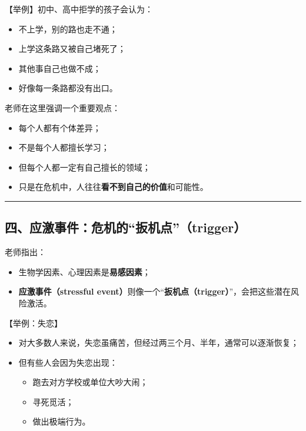 \documentclass[
  chinese,
  9pt,
  a4paper,
]{ctexart}
\providecommand{\tightlist}{%
  \setlength{\itemsep}{0pt}\setlength{\parskip}{0pt}}
\begin{document}
【举例】初中、高中拒学的孩子会认为：

\begin{itemize}
\tightlist
\item
  不上学，别的路也走不通；
\item
  上学这条路又被自己堵死了；
\item
  其他事自己也做不成；
\item
  好像每一条路都没有出口。
\end{itemize}

老师在这里强调一个重要观点：

\begin{itemize}
\tightlist
\item
  每个人都有个体差异；
\item
  不是每个人都擅长学习；
\item
  但每个人都一定有自己擅长的领域；
\item
  只是在危机中，人往往\textbf{看不到自己的价值}和可能性。
\end{itemize}

\begin{center}\rule{0.5\linewidth}{0.5pt}\end{center}

\subsection{四、应激事件：危机的``扳机点''（trigger）}\label{ux56dbux5e94ux6fc0ux4e8bux4ef6ux5371ux673aux7684ux6273ux673aux70b9trigger}

老师指出：

\begin{itemize}
\tightlist
\item
  生物学因素、心理因素是\textbf{易感因素}；
\item
  \textbf{应激事件（stressful
  event）}则像一个``\textbf{扳机点（trigger）}''，会把这些潜在风险激活。
\end{itemize}

【举例：失恋】

\begin{itemize}
\item
  对大多数人来说，失恋虽痛苦，但经过两三个月、半年，通常可以逐渐恢复；
\item
  但有些人会因为失恋出现：

  \begin{itemize}
  \tightlist
  \item
    跑去对方学校或单位大吵大闹；
  \item
    寻死觅活；
  \item
    做出极端行为。
  \end{itemize}
\end{itemize}
\end{document}
